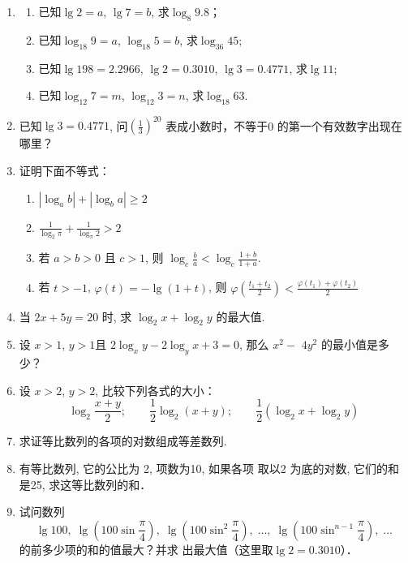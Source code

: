 \begin{enumerate}
\begin{enumerate}
  \item \[\begin{split}
    &\quad \frac{1}{(\log_x 2)(\log_x 4)}+   \frac{1}{(\log_x 4)(\log_x 8)}+   \frac{1}{(\log_x 8)(\log_x 16)}+\cdots \\
    &+   \frac{1}{(\log_x 2^{n-1})(\log_x 2^n)}=\left(1-\frac{1}{n}\right)\left(\frac{1}{\log_x 2}\right)^2
  \end{split}\]
\end{enumerate}

\item \begin{enumerate}
  \item 已知$\lg2=a$, $\lg7=b$, 求$\log_8 9.8$；
  \item 已知$\log_{18}9=a$, $\log_{18}5=b$, 求$\log_{36}45$;
  \item 已知$\lg198=2.2966$, $\lg2=0.3010$, $\lg3=0.4771$, 求$\lg 11$;
  \item 已知$\log_{12}7=m$, $\log_{12}3=n$, 求$\log_{18}63$.
\end{enumerate} 
\item 已知$\lg3=0.4771$, 问$\left(\frac{1}{3}\right)^{20}$
表成小数时，不等于0
的第一个有效数字出现在哪里？

\item  证明下面不等式：
\begin{enumerate}
  \item $\left|\log _{a} b\right|+\left|\log _{b} a\right| \geqslant 2$
  \item  $\frac{1}{\log _{2} \pi}+\frac{1}{\log _{\pi} 2}>2$
  \item 若 $a>b>0$ 且 $c>1$, 则 $\log _{c} \frac{b}{a}<\log _{c} \frac{1+b}{1+a}$.
  \item 若 $t>-1$, $\varphi(t)=-\lg(1+t)$, 则 $\varphi\left(\frac{t_{1}+t_{2}}{2}\right)<\frac{\varphi\left(t_{1}\right)+\varphi\left(t_{2}\right)}{2}$
\end{enumerate}


\item 当 $2 x+5 y=20$ 时, 求 $\log _{2} x+\log _{2} y$ 的最大值.
\item 设 $x>1$, $y>1$且 $2 \log _{x} y-2 \log _{y} x+3=0$, 那么 $x^{2}-$ $4 y^{2}$ 的最小值是多少？
\item  设 $x>2$, $y>2$, 比较下列各式的大小：
$$\log _{2} \frac{x+y}{2} ;\qquad \frac{1}{2} \log _{2}(x+y); \qquad \frac{1}{2}\left(\log _{2} x+\log _{2} y\right)$$
\item  求证等比数列的各项的对数组成等差数列.
\item  有等比数列, 它的公比为 2, 项数为10, 如果各项 取以2 为底的对数, 它们的和是25, 求这等比数列的和．

\item 试问数列
$$\lg100,\; \lg\left(100\sin\frac{\pi}{4}\right),\; \lg\left(100\sin^2\frac{\pi}{4}\right),\; \ldots ,\; \lg\left(100\sin^{n-1}\frac{\pi}{4}\right),\; \ldots$$
的前多少项的和的值最大？并求
出最大值（这里取$\lg2=0.3010$）．
\end{enumerate}

